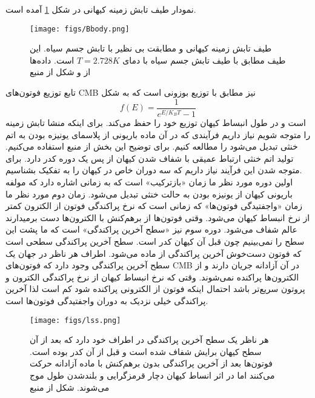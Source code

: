 نمودار طیف تابش زمینه کیهانی در شکل 
\ref{fig:Bbody}
آمده است.
\begin{figure}[h!]
	\begin{center}
		\texttt{[image: figs/Bbody.png]}
	\end{center}
	\caption[]	
	{    
		طیف تابش زمینه کیهانی و مطابقت بی نظیر با تابش جسم سیاه. این طیف مطابق با طیف تابش جسم سیاه با دمای 
		$T = 2.728 K$
		است. داده‌ها از 
		\cite{kogut2006arcade}
		و شکل از منبع
		\cite{durrer2008cosmic}
	}
	\label{fig:Bbody}
\end{figure}
تابع توزیع فوتون‌های CMB نیز مطابق با توزیع بوزونی است که به شکل 
\begin{equation}
f(E) = \frac{1}{e^{E/K_B T} -1 }
\end{equation} 
است و در طول انبساط کیهان توزیع خود را حفظ می‌کند.
برای اینکه منشا تابش زمینه را متوجه شویم نیاز داریم فرآیندی که در آن ماده باریونی از پلاسمای یونیزه بودن به اتم خنثی تبدیل می‌شود را مطالعه کنیم. برای توضیح این بخش از منبع 
\cite{ryden2017introduction}
استفاده می‌کنیم. تولید اتم خنثی ارتباط عمیقی با شفاف شدن کیهان از پس یک دوره کدر دارد. برای متوجه شدن این فرآیند نیاز داریم که سه دوران خاص در کیهان را به تفکیک بشناسیم.
\\
اولین دوره مورد نظر ما زمان «بازترکیب»
است که به زمانی اشاره دارد که مولفه باریونی کیهان از یونیزه بودن به حالت خنثی تبدیل می‌شود. 
زمان دوم مورد نظر ما زمان «واجفتیدگی فوتون‌ها»
که زمانی است که نرخ پراکندگی فوتون‌ از الکترون کمتر از نرخ انبساط کیهان می‌شود. وقتی فوتون‌‌ها از برهم‌کنش با الکترون‌‌ها دست برمیدارند عالم شفاف می‌شود.
دوره سوم نیز «سطح آخرین پراکندگی»
است که ما پشت این سطح را نمی‌بینیم چون قبل آن کیهان کدر است. سطح آخرین پراکندگی سطحی است که فوتون دست‌خوش آخرین پراکندگی از ماده می‌شود. اطراف هر ناظر در جهان یک سطح آخرین پراکندگی وجود دارد که فوتون‌های  CMB در آن آزادانه جریان دارند و از الکترون‌ها پراکنده نمی‌شوند. وقتی که نرخ انبساط کیهان از نرخ پراکندگی الکترون و پروتون سریع‌تر باشد احتمال اینکه فوتون از الکترونی پراکنده شود کم است لذا آخرین پراکندگی خیلی نزدیک به دوران واجفتیدگی فوتون‌ها است.
\begin{figure}[h!]
	\begin{center}
		\texttt{[image: figs/lss.png]}
	\end{center}
	\caption	
	{ هر ناظر یک سطح آخرین پراکندگی در اطراف خود دارد که بعد از آن سطح کیهان برایش شفاف شده است و قبل از آن کدر بوده است. فوتون‌ها بعد از آخرین پراکندگی بدون برهم‌کنش با ماده آزادانه حرکت می‌کنند اما در اثر انساط کیهان دچار قرمزگرایی و بلندشدن طول موج می‌شوند. شکل از منبع
		\cite{ryden2017introduction}
	}
	\label{fig:lss}
\end{figure}
